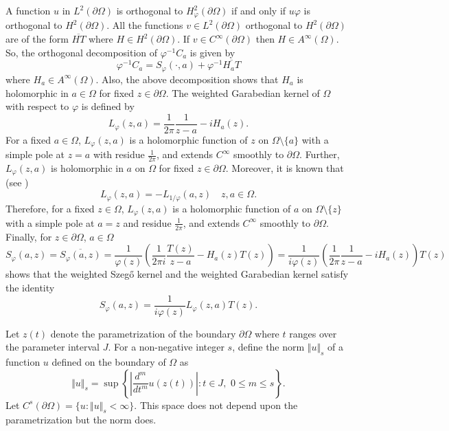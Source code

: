 \documentclass[11pt, reqno]{amsart}
\numberwithin{equation}{section}
\begin{document}
\medskip

A function $u$ in $L^2(\partial\Omega)$ is orthogonal to $H^2_{\varphi}(\partial\Omega)$ if and only if $u\varphi$ is orthogonal to $H^2(\partial\Omega)$. All the functions $v\in L^2(\partial\Omega)$ orthogonal to $H^2(\partial\Omega)$ are of the form $\overline{HT}$ where $H\in H^2(\partial\Omega)$. If $v\in C^{\infty}(\partial\Omega)$ then $H\in A^{\infty}(\Omega)$. So, the orthogonal decomposition of $\varphi^{-1}C_a$ is given by
\begin{equation}
\varphi^{-1}C_a = S_{\varphi}(\cdot,a) + \varphi^{-1} \overline{H_aT}
\end{equation}
where $H_a\in A^{\infty}(\Omega)$. Also, the above decomposition shows that $H_a$ is holomorphic in $a\in\Omega$ for fixed $z\in\partial\Omega$. The weighted Garabedian kernel of $\Omega$ with respect to $\varphi$ is defined by
\begin{equation}
L_{\varphi}(z,a) = \frac{1}{2\pi}\frac{1}{z-a} - i H_a(z).
\end{equation}
For a fixed $a\in\Omega$, $L_{\varphi}(z,a)$ is a holomorphic function of $z$ on $\Omega\setminus\{a\}$ with a simple pole at $z=a$ with residue $\frac{1}{2\pi}$, and extends $C^{\infty}$ smoothly to $\partial\Omega$. Further, $L_{\varphi}(z,a)$ is holomorphic in $a$ on $\Omega$ for fixed $z\in \partial\Omega$. Moreover, it is known that (see \cite{Nehari})
\begin{equation}\label{garabedian}
L_{\varphi}(z,a) = - L_{1/\varphi}(a,z) \quad  z,a\in\Omega.
\end{equation}
Therefore, for a fixed $z\in\Omega$, $L_{\varphi}(z,a)$ is a holomorphic function of $a$ on $\Omega\setminus\{z\}$ with a simple pole at $a=z$ and residue $\frac{1}{2\pi}$, and extends $C^{\infty}$ smoothly to $\partial\Omega$. Finally, for $z \in \partial \Omega$, $a \in \Omega$
\[
S_{\varphi}(a,z) = \overline{S_{\varphi}(a,z)} 
=
\frac{1}{\varphi(z)}\left(\frac{1}{2\pi i}\frac{T(z)}{z-a}-H_a(z) T(z)\right)
=
\frac{1}{i\varphi(z)}\left(\frac{1}{2\pi}\frac{1}{z-a}-iH_a(z)\right)T(z)
\]
shows that the weighted Szeg\H{o} kernel and the weighted Garabedian kernel satisfy the identity
\begin{equation}
S_{\varphi}(a,z) = \frac{1}{i\varphi(z)} L_{\varphi}(z,a) T(z).
\end{equation}

\medskip

Let $z(t)$ denote the parametrization of the boundary $\partial\Omega$ where $t$ ranges over the parameter interval $J$. For a non-negative integer $s$, define the norm $\Vert u\Vert_s$ of a function $u$ defined on the boundary of $\Omega$ as
\[
\Vert u\Vert_s = \sup\left\lbrace\left\lvert \frac{d^m}{dt^m}u(z(t))\right\rvert : t\in J, \, \, 0\leq m\leq s\right\rbrace.
\]
Let $C^s(\partial\Omega) = \{ u : \Vert u\Vert_s < \infty\}$. This space does not depend upon the parametrization but the norm does.
\end{document}

